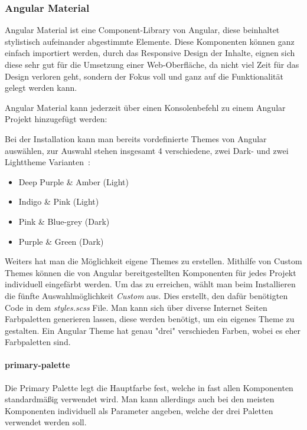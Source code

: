\cite{rendering-engine-ivy, incremental-dom}

\cleardoublepage

\subsubsection{Angular Material}
Angular Material ist eine Component-Library von Angular, diese beinhaltet stylistisch aufeinander abgestimmte Elemente.
Diese Komponenten können ganz einfach importiert werden, durch das Responsive Design der Inhalte, eignen sich diese sehr gut
für die Umsetzung einer Web-Oberfläche, da nicht viel Zeit für das Design verloren geht, sondern der Fokus voll und ganz
auf die Funktionalität gelegt werden kann.

Angular Material kann jederzeit über einen Konsolenbefehl zu einem Angular Projekt hinzugefügt werden:
\begin{center}
\end{center}

Bei der Installation kann man bereits vordefinierte Themes von Angular auswählen, zur Auswahl stehen insgesamt 4 verschiedene,
zwei Dark- und zwei Lighttheme Varianten~\cite{angular-material-predefined-themes}:

\begin{itemize}
    \item Deep Purple \& Amber (Light)
    \item Indigo \& Pink (Light)
    \item Pink \& Blue-grey (Dark)
    \item Purple \& Green (Dark)
\end{itemize}

Weiters hat man die Möglichkeit eigene Themes zu erstellen.
Mithilfe von Custom Themes können die von Angular bereitgestellten Komponenten für jedes Projekt individuell eingefärbt werden.
Um das zu erreichen, wählt man beim Installieren die fünfte Auswahlmöglichkeit \emph{Custom} aus.
Dies erstellt, den dafür benötigten Code in dem \emph{styles.scss} File.
Man kann sich über diverse Internet Seiten Farbpaletten generieren lassen, diese werden benötigt, um ein eigenes Theme zu gestalten.
Ein Angular Theme hat genau "drei" verschieden Farben, wobei es eher Farbpaletten sind.

\paragraph{primary-palette}
Die Primary Palette legt die Hauptfarbe fest, welche in fast allen Komponenten standardmäßig verwendet wird.
Man kann allerdings auch bei den meisten Komponenten individuell als Parameter angeben, welche der drei Paletten verwendet werden soll.

